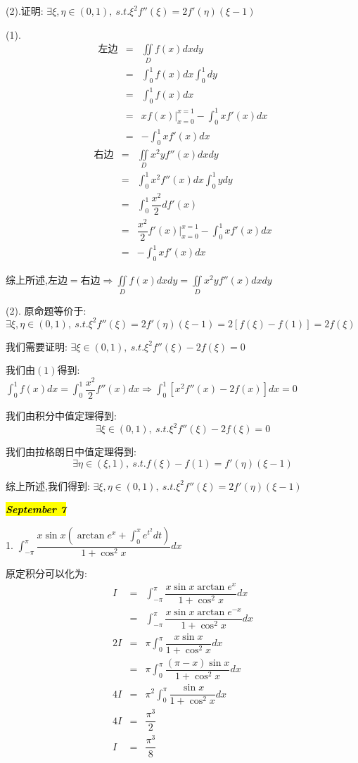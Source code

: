 (2).证明:  $\exists \xi,\eta\in(0,1),\ s.t. \xi^2f''(\xi)=2f'(\eta)(\xi-1)$
\begin{solution}

	(1). \begin{eqnarray*}
		\text{左边}&=&\iint\limits_{D}f(x)dxdy\\
		&=&\int_{0}^{1}f(x)dx\int_{0}^{1}dy\\
		&=&\int_{0}^{1}f(x)dx\\
		&=&xf(x)|_{x=0}^{x=1}-\int_{0}^{1}xf'(x)dx\\
		&=&-\int_{0}^{1}xf'(x)dx
	\end{eqnarray*}
	\begin{eqnarray*}
		\text{右边}&=&\iint\limits_{D}x^2yf''(x)dxdy\\
		&=&\int_{0}^{1}x^2f''(x)dx\int_{0}^{1}ydy\\
		&=&\int_{0}^{1}\dfrac{x^2}{2}df'(x)\\
		&=&\dfrac{x^2}{2}f'(x)|_{x=0}^{x=1}-\int_{0}^{1}xf'(x)dx\\
		&=&-\int_{0}^{1}xf'(x)dx
	\end{eqnarray*}
	
	综上所述,$\text{左边}=\text{右边}\Rightarrow \iint\limits_{D}f(x)dxdy=\iint\limits_{D}x^2yf''(x)dxdy$
	
	(2). 原命题等价于:  $\exists \xi,\eta\in(0,1),\ s.t. \xi^2f''(\xi)=2f'(\eta)(\xi-1)=2[f(\xi)-f(1)]=2f(\xi)$
	
	我们需要证明:  $\exists \xi\in(0,1),\ s.t. \xi^2f''(\xi)-2f(\xi)=0$
	
	我们由$(1)$得到:  $\int_{0}^{1}f(x)dx=\int_{0}^{1}\dfrac{x^2}{2}f''(x)dx\Rightarrow \int_{0}^{1}[x^2f''(x)-2f(x)]dx=0$
	
	我们由积分中值定理得到:  
	$$\exists \xi\in(0,1),\ s.t. \xi^2f''(\xi)-2f(\xi)=0$$
	
	我们由拉格朗日中值定理得到:  
	$$\exists\eta\in(\xi,1),\ s.t. f(\xi)-f(1)=f'(\eta)(\xi-1)$$
	
	综上所述,我们得到:  $\exists \xi,\eta\in(0,1),\ s.t. \xi^2f''(\xi)=2f'(\eta)(\xi-1)$
\end{solution}

\hl{\textbf{\textit{September 7}}}

1. $\int_{-\pi}^{\pi}\dfrac{x\sin x\left( \arctan e^x+\int_{0}^{x}e^{t^2}dt\right) }{1+\cos^2 x}dx$
\begin{solution}

	原定积分可以化为:  
	\begin{eqnarray*}
		I&=&\int_{-\pi}^{\pi}\dfrac{x\sin x\arctan e^x}{1+\cos^2 x}dx\\
		&=&\int_{-\pi}^{\pi}\dfrac{x\sin x\arctan e^{-x}}{1+\cos^2 x}dx\\
		2I&=&\pi\int_{0}^{\pi}\dfrac{x\sin x}{1+\cos^2 x}dx\\
		&=&\pi\int_{0}^{\pi}\dfrac{(\pi-x)\sin x}{1+\cos^2 x}dx\\
		4I&=&\pi^2\int_{0}^{\pi}\dfrac{\sin x}{1+\cos^2 x}dx\\
		4I&=&\dfrac{\pi^3}{2}\\
		I&=&\dfrac{\pi^3}{8}
	\end{eqnarray*}
\end{solution}

